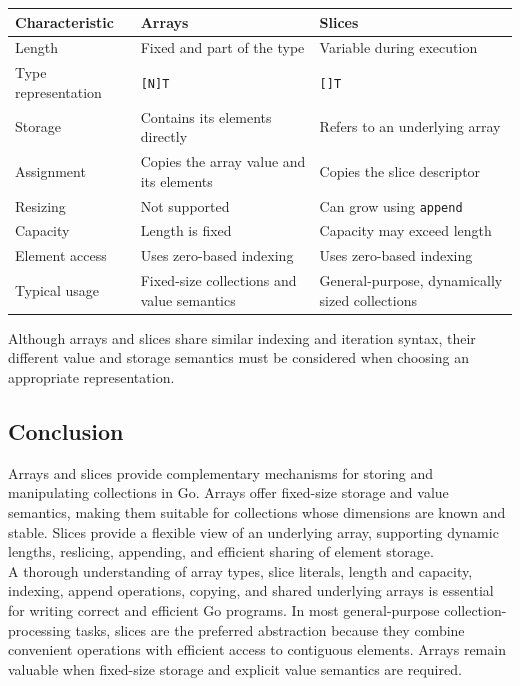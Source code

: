 \begin{center}
\begin{tabular}{|p{3.2cm}|p{5.0cm}|p{5.0cm}|}
\hline
\textbf{Characteristic} & \textbf{Arrays} & \textbf{Slices} \\
\hline
Length & Fixed and part of the type & Variable during execution \\
\hline
Type representation & \texttt{[N]T} & \texttt{[]T} \\
\hline
Storage & Contains its elements directly & Refers to an underlying array \\
\hline
Assignment & Copies the array value and its elements & Copies the slice descriptor \\
\hline
Resizing & Not supported & Can grow using \texttt{append} \\
\hline
Capacity & Length is fixed & Capacity may exceed length \\
\hline
Element access & Uses zero-based indexing & Uses zero-based indexing \\
\hline
Typical usage & Fixed-size collections and value semantics & General-purpose, dynamically sized collections \\
\hline
\end{tabular}
\end{center}

Although arrays and slices share similar indexing and iteration syntax, their different value and storage semantics must be considered when choosing an appropriate representation.

\subsection{Conclusion}

Arrays and slices provide complementary mechanisms for storing and manipulating collections in Go. Arrays offer fixed-size storage and value semantics, making them suitable for collections whose dimensions are known and stable. Slices provide a flexible view of an underlying array, supporting dynamic lengths, reslicing, appending, and efficient sharing of element storage.\\

A thorough understanding of array types, slice literals, length and capacity, indexing, append operations, copying, and shared underlying arrays is essential for writing correct and efficient Go programs. In most general-purpose collection-processing tasks, slices are the preferred abstraction because they combine convenient operations with efficient access to contiguous elements. Arrays remain valuable when fixed-size storage and explicit value semantics are required.